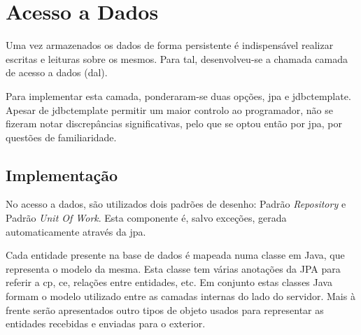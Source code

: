 %
%
\section{Acesso a Dados}\label{sec33}

Uma vez armazenados os dados de forma persistente é indispensável realizar escritas e leituras sobre os mesmos. Para tal, desenvolveu-se a chamada camada de acesso a dados (\gls{dal}). 

Para implementar esta camada, ponderaram-se duas opções, \gls{jpa} e \gls{jdbctemplate}. Apesar de \acrshort{jdbctemplate} permitir um maior controlo ao programador, não se fizeram notar discrepâncias significativas, pelo que se optou então por \acrshort{jpa}, por questões de familiaridade.

 \subsection{Implementação}\label{subsec331}
 
 No acesso a dados, são utilizados dois padrões de desenho: Padrão \textit{Repository} e Padrão \textit{Unit Of Work}. Esta componente é, salvo exceções, gerada automaticamente através da \acrshort{jpa}.
 
 Cada entidade presente na base de dados é mapeada numa classe em Java, que representa o modelo da mesma. Esta classe tem várias anotações da JPA para referir a \acrlong{cp}, \acrlong{ce}, relações entre entidades, etc. Em conjunto estas classes Java formam o modelo utilizado entre as camadas internas do lado do servidor. Mais à frente serão apresentados outro tipos de objeto usados para representar as entidades recebidas e enviadas para o exterior.
 
 

